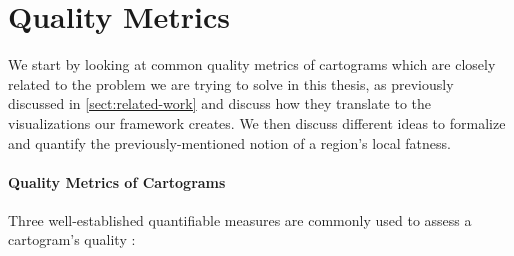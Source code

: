 \section{Quality Metrics}
\label{sect:quality-metrics}

We start by looking at common quality metrics of cartograms \emdash{} which are closely related to the problem we are trying to solve in this thesis, as previously discussed in \cref{sect:related-work} \emdash{} and discuss how they translate to the visualizations our framework creates.
We then discuss different ideas to formalize and quantify the previously-mentioned notion of a region's local fatness.



\paragraph{Quality Metrics of Cartograms}

Three well-established quantifiable measures are commonly used to assess a cartogram's quality \cite{alam2015quantitative} \cite{nusrat2018evaluating}:

